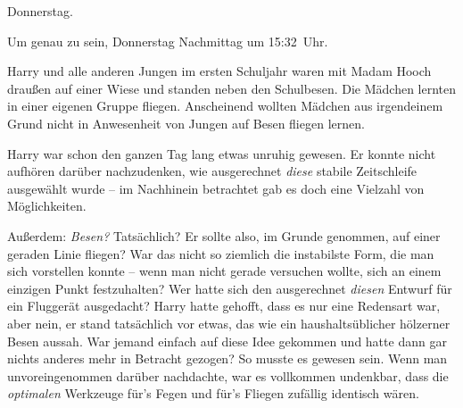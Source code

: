 \later

Donnerstag.

Um genau zu sein, Donnerstag Nachmittag um 15:32~Uhr.

Harry und alle anderen Jungen im ersten Schuljahr waren mit Madam Hooch draußen auf einer Wiese und standen neben den Schulbesen. Die Mädchen lernten in einer eigenen Gruppe fliegen. Anscheinend wollten Mädchen aus irgendeinem Grund nicht in Anwesenheit von Jungen auf Besen fliegen lernen.

Harry war schon den ganzen Tag lang etwas unruhig gewesen. Er konnte nicht aufhören darüber nachzudenken, wie ausgerechnet \emph{diese} stabile Zeitschleife ausgewählt wurde – im Nachhinein betrachtet gab es doch eine Vielzahl von Möglichkeiten.

Außerdem: \emph{Besen?} Tatsächlich? Er sollte also, im Grunde genommen, auf einer geraden Linie fliegen? War das nicht so ziemlich die instabilste Form, die man sich vorstellen konnte – wenn man nicht gerade versuchen wollte, sich an einem einzigen Punkt festzuhalten? Wer hatte sich den ausgerechnet \emph{diesen} Entwurf für ein Fluggerät ausgedacht? Harry hatte gehofft, dass es nur eine Redensart war, aber nein, er stand tatsächlich vor etwas, das wie ein haushaltsüblicher hölzerner Besen aussah. War jemand einfach auf diese Idee gekommen und hatte dann gar nichts anderes mehr in Betracht gezogen? So musste es gewesen sein. Wenn man unvoreingenommen darüber nachdachte, war es vollkommen undenkbar, dass die \emph{optimalen} Werkzeuge für’s Fegen und für’s Fliegen zufällig identisch wären.

